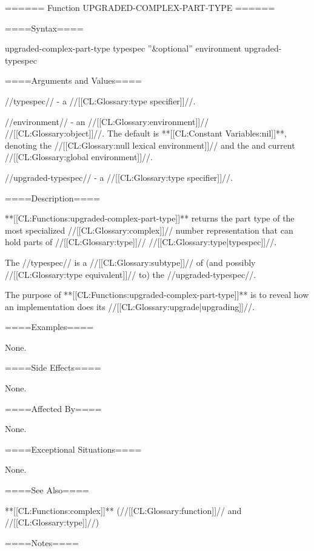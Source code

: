====== Function UPGRADED-COMPLEX-PART-TYPE ======

====Syntax====

\DefunWithValues upgraded-complex-part-type {typespec ''&optional'' environment} {upgraded-typespec}

====Arguments and Values====

//typespec// - a //[[CL:Glossary:type specifier]]//.

//environment// - an //[[CL:Glossary:environment]]// //[[CL:Glossary:object]]//. The default is **[[CL:Constant Variables:nil]]**, denoting the //[[CL:Glossary:null lexical environment]]// and the and current //[[CL:Glossary:global environment]]//.

//upgraded-typespec// - a //[[CL:Glossary:type specifier]]//.

====Description====

**[[CL:Functions:upgraded-complex-part-type]]** returns the part type of the most specialized //[[CL:Glossary:complex]]// number representation that can hold parts of //[[CL:Glossary:type]]// //[[CL:Glossary:type|typespec]]//.

The //typespec// is a //[[CL:Glossary:subtype]]// of (and possibly //[[CL:Glossary:type equivalent]]// to) the //upgraded-typespec//.

The purpose of **[[CL:Functions:upgraded-complex-part-type]]** is to reveal how an implementation does its //[[CL:Glossary:upgrade|upgrading]]//.

====Examples====

None.

====Side Effects====

None.

====Affected By====

None.

====Exceptional Situations====

None.

====See Also====

**[[CL:Functions:complex]]** (//[[CL:Glossary:function]]// and //[[CL:Glossary:type]]//)

====Notes====

 
